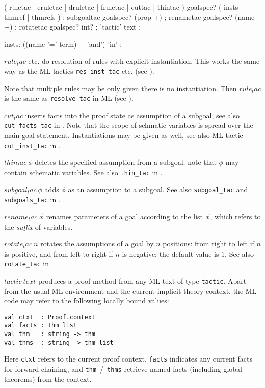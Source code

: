 \begin{rail}
  ( ruletac | eruletac | druletac | fruletac | cuttac | thintac ) goalspec?
  ( insts thmref | thmrefs )
  ;
  subgoaltac goalspec? (prop +)
  ;
  renametac goalspec? (name +)
  ;
  rotatetac goalspec? int?
  ;
  'tactic' text
  ;

  insts: ((name '=' term) + 'and') 'in'
  ;
\end{rail}

\begin{descr}
\item [$rule_tac$ etc.] do resolution of rules with explicit instantiation.
  This works the same way as the ML tactics \texttt{res_inst_tac} etc. (see
  \cite[\S3]{isabelle-ref}).

  Note that multiple rules may be only given there is no instantiation.  Then
  $rule_tac$ is the same as \texttt{resolve_tac} in ML (see
  \cite[\S3]{isabelle-ref}).
\item [$cut_tac$] inserts facts into the proof state as assumption of a
  subgoal, see also \texttt{cut_facts_tac} in \cite[\S3]{isabelle-ref}.  Note
  that the scope of schmatic variables is spread over the main goal statement.
  Instantiations may be given as well, see also ML tactic
  \texttt{cut_inst_tac} in \cite[\S3]{isabelle-ref}.
\item [$thin_tac~\phi$] deletes the specified assumption from a subgoal; note
  that $\phi$ may contain schematic variables.  See also \texttt{thin_tac} in
  \cite[\S3]{isabelle-ref}.
\item [$subgoal_tac~\phi$] adds $\phi$ as an assumption to a subgoal.  See
  also \texttt{subgoal_tac} and \texttt{subgoals_tac} in
  \cite[\S3]{isabelle-ref}.
\item [$rename_tac~\vec x$] renames parameters of a goal according to the list
  $\vec x$, which refers to the \emph{suffix} of variables.
\item [$rotate_tac~n$] rotates the assumptions of a goal by $n$ positions:
  from right to left if $n$ is positive, and from left to right if $n$ is
  negative; the default value is $1$.  See also \texttt{rotate_tac} in
  \cite[\S3]{isabelle-ref}.
\item [$tactic~text$] produces a proof method from any ML text of type
  \texttt{tactic}.  Apart from the usual ML environment and the current
  implicit theory context, the ML code may refer to the following locally
  bound values:

{\footnotesize\begin{verbatim}
val ctxt  : Proof.context
val facts : thm list
val thm   : string -> thm
val thms  : string -> thm list
\end{verbatim}}
  Here \texttt{ctxt} refers to the current proof context, \texttt{facts}
  indicates any current facts for forward-chaining, and
  \texttt{thm}~/~\texttt{thms} retrieve named facts (including global
  theorems) from the context.
\end{descr}


